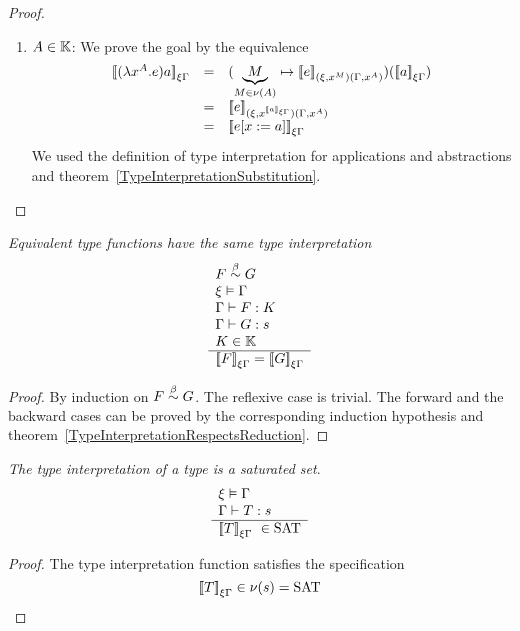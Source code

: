 \begin{theorem}
\begin{proof}
\begin{enumerate}
        \item $A \in \mathbb{K}$: We prove the goal by the equivalence
            $$
            \begin{array}{lll}
                \typeinter{(\lambda x^A.e)a}{\xi\Gamma}
                &=&
                (
                    \underbrace M_{M \in \nu(A)}
                    \mapsto
                    \typeinter{e}{(\xi,x^M)(\Gamma,x^A)}
                )
                (
                    \typeinter{a}{\xi\Gamma}
                )
                \\
                &=&
                \typeinter
                {e}
                {(\xi,x^{\typeinter{a}{\xi\Gamma}})(\Gamma,x^A)}
                \\
                &=&
                \typeinter{e[x:=a]}{\xi\Gamma}
            \end{array}
            $$
            We used the definition of type interpretation for applications and
                abstractions and
                theorem~\ref{TypeInterpretationSubstitution}.
        \end{enumerate}
    \end{proof}
\end{theorem}





\begin{theorem}
    \label{TypeInterpretationEquivalence}
    \emph{Equivalent type functions have the same type interpretation}
    $$
    \begin{array}{l} 
        F \stackrel{\beta}{\sim} G
        \\
        \xi \vDash \Gamma
        \\
        \Gamma \vdash F : K
        \\
        \Gamma \vdash G : s
        \\
        K \in \mathbb{K}
     \\ \hline 
        {{[\![}F{]\!]}}_{\xi\Gamma} = {{[\![} G{]\!]}}_{\xi\Gamma}
    \end{array}
    $$
    \begin{proof} By induction on $F \stackrel{\beta}{\sim} G$. The reflexive case is trivial.
        The forward and the backward cases can be proved by the corresponding
        induction hypothesis and
        theorem~\ref{TypeInterpretationRespectsReduction}.
    \end{proof}
\end{theorem}


\begin{theorem}
    \label{TypeInterpretationTypeSaturated}
    \emph{The type interpretation of a type is a saturated set}.
    $$
    \rulev{
        \xi \vDash \Gamma
        \\
        \Gamma \vdash T : s
    }
    {
        \typeinter{T}{\xi\Gamma} \in \SAT
    }
    $$
    \begin{proof}
        The type interpretation function satisfies the specification
        $$
        {{[\![} T{]\!]}}_{\xi\Gamma} \in \nu(s) = \text{SAT}
        $$
    \end{proof}
\end{theorem}







